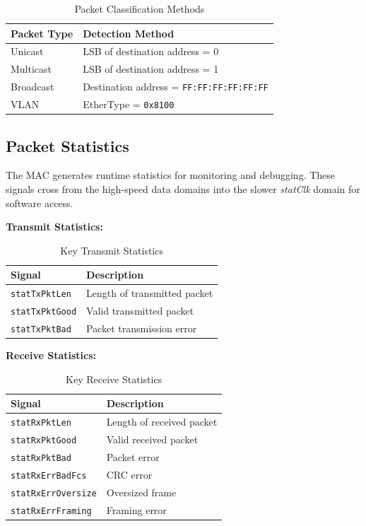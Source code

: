 \begin{table}[H]
\centering
\begin{tabular}{|l|l|}
\hline
\textbf{Packet Type} & \textbf{Detection Method} \\ \hline \hline
Unicast & LSB of destination address = 0 \\ \hline
Multicast & LSB of destination address = 1 \\ \hline
Broadcast & Destination address = \texttt{FF:FF:FF:FF:FF:FF} \\ \hline
VLAN & EtherType = \texttt{0x8100} \\ \hline
\end{tabular}
\caption{Packet Classification Methods}\label{table:pkt_class}
\end{table}

\subsection{Packet Statistics}
The MAC generates runtime statistics for monitoring and debugging. These signals cross from the high-speed data domains into the slower \textit{statClk} domain for software access.

\textbf{Transmit Statistics:}
\begin{table}[H]
\centering
\begin{tabular}{|l|l|}
\hline
\textbf{Signal} & \textbf{Description} \\ \hline \hline
\texttt{statTxPktLen} & Length of transmitted packet \\ \hline
\texttt{statTxPktGood} & Valid transmitted packet \\ \hline
\texttt{statTxPktBad} & Packet transmission error \\ \hline
\end{tabular}
\caption{Key Transmit Statistics}\label{table:tx_stats}
\end{table}

\textbf{Receive Statistics:}
\begin{table}[H]
\centering
\begin{tabular}{|l|l|}
\hline
\textbf{Signal} & \textbf{Description} \\ \hline \hline
\texttt{statRxPktLen} & Length of received packet \\ \hline
\texttt{statRxPktGood} & Valid received packet \\ \hline
\texttt{statRxPktBad} & Packet error \\ \hline
\texttt{statRxErrBadFcs} & CRC error \\ \hline
\texttt{statRxErrOversize} & Oversized frame \\ \hline
\texttt{statRxErrFraming} & Framing error \\ \hline
\end{tabular}
\caption{Key Receive Statistics}\label{table:rx_stats}
\end{table}

